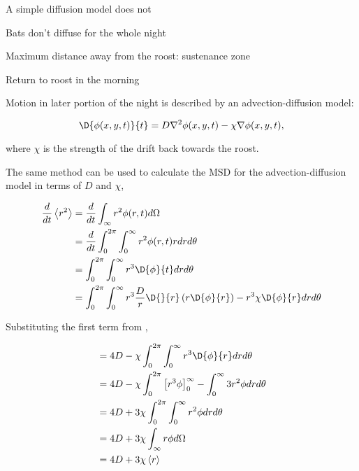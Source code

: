 A simple diffusion model does not

Bats don't diffuse for the whole night

Maximum distance away from the roost: sustenance zone

Return to roost in the morning

Motion in later portion of the night is described by an advection-diffusion model:

\begin{equation}
  \D{\phi(x,y,t)}{t} = D \nabla^2 \phi(x,y,t) - \chi \nabla \phi(x,y,t),
  \nonumber
\end{equation}

where $\chi$ is the strength of the drift back towards the roost.

The same method can be used to calculate the MSD for the advection-diffusion model in terms of $D$ and $\chi$,

\begin{equation}
\begin{split}
\frac{d}{dt} \left<r^2\right> &= \frac{d}{dt}\int_{\infty}r^2 \phi(r,t) d\Omega \\
                              &= \frac{d}{dt} \int_0^{2\pi}\int_0^{\infty} r^2 \phi(r,t) r dr d\theta \\
                              &= \int_0^{2\pi} \int_0^{\infty} r^3 \D{\phi}{t} dr d\theta \\
                              &= \int_0^{2\pi} \int_0^{\infty} r^3 \frac{D}{r} \D{}{r}\left(r \D{\phi}{r}\right)- r^3\chi\D{\phi}{r} dr d\theta \\
\end{split}
\end{equation}


Substituting the first term from ,

\begin{equation}
\begin{split}
                              &= 4D - \chi \int_0^{2\pi} \int_0^{\infty} r^3 \D{\phi}{r} dr d\theta \\
                              &= 4D - \chi \int_0^{2\pi} \left[ r^3 \phi \right]_0^{\infty} - \int_0^{\infty}  3 r^2 \phi dr d\theta \\
                              &= 4D + 3\chi \int_0^{2\pi} \int_0^{\infty}  r^2 \phi dr d\theta  \\
                              &= 4D + 3\chi \int_{\infty} r \phi d\Omega \\
                              &= 4D + 3\chi \left<r\right>
\nonumber
\end{split}
\end{equation}

